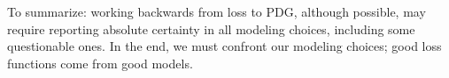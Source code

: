 \documentclass[twoside]{article}
\theoremstyle{plain}
\theoremstyle{definition}
\begin{document}
To summarize:
working backwards from loss to PDG, although possible, may require reporting absolute certainty in all modeling choices, including some questionable ones.
In the end, we must confront our modeling choices;
good loss functions come from good models.
\end{document}
